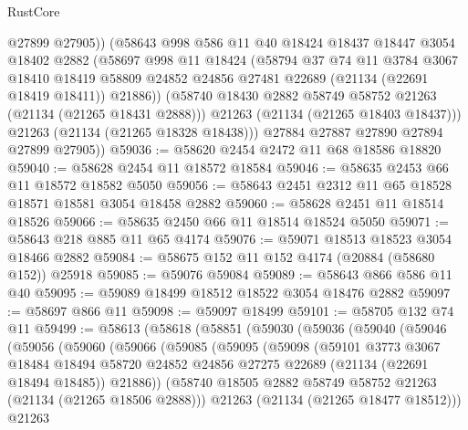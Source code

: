 \begin{lexlean}{RustCore}
\begin{coremodule}
              @27899
              @27905))
          (@58643
            @998
            @586
            @11
            @40
            @18424
            @18437
            @18447
            @3054
            @18402
            @2882
            (@58697
              @998
              @11
              @18424
              (@58794
                @37
                @74
                @11
                @3784
                @3067
                @18410
                @18419
                @58809
                @24852
                @24856
                @27481
                @22689
                (@21134 (@22691 @18419 @18411))
                @21886))
            (@58740 @18430 @2882 @58749 @58752 @21263 (@21134 (@21265 @18431 @2888)))
            @21263
            (@21134 (@21265 @18403 @18437)))
          @21263
          (@21134 (@21265 @18328 @18438)))
        @27884
        @27887
        @27890
        @27894
        @27899
        @27905))
@59036 := @58620 @2454 @2472 @11 @68 @18586 @18820
@59040 := @58628 @2454 @11 @18572 @18584
@59046 := @58635 @2453 @66 @11 @18572 @18582 @5050
@59056 := @58643 @2451 @2312 @11 @65 @18528 @18571 @18581 @3054 @18458 @2882
@59060 := @58628 @2451 @11 @18514 @18526
@59066 := @58635 @2450 @66 @11 @18514 @18524 @5050
@59071 := @58643 @218 @885 @11 @65 @4174
@59076 := @59071 @18513 @18523 @3054 @18466 @2882
@59084 := @58675 @152 @11 @152 @4174 (@20884 (@58680 @152)) @25918
@59085 := @59076 @59084
@59089 := @58643 @866 @586 @11 @40
@59095 := @59089 @18499 @18512 @18522 @3054 @18476 @2882
@59097 := @58697 @866 @11
@59098 := @59097 @18499
@59101 := @58705 @132 @74 @11
@59499 := @58613
    (@58618
      (@58851
        (@59030
          (@59036
            (@59040
              (@59046
                (@59056
                  (@59060
                    (@59066
                      (@59085
                        (@59095
                          (@59098
                            (@59101
                              @3773
                              @3067
                              @18484
                              @18494
                              @58720
                              @24852
                              @24856
                              @27275
                              @22689
                              (@21134 (@22691 @18494 @18485))
                              @21886))
                          (@58740 @18505 @2882 @58749 @58752 @21263 (@21134 (@21265 @18506 @2888)))
                          @21263
                          (@21134 (@21265 @18477 @18512)))
                        @21263

\end{coremodule}
\end{lexlean}
